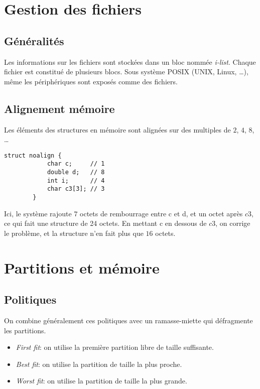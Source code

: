 \documentclass[a4paper]{article}
\begin{document}
\begin{multicols*}{2}
    \section{Gestion des fichiers}

    \subsection{Généralités}
    Les informations sur les fichiers sont stockées dans un bloc nommée \emph{i-list}.
    Chaque fichier est constitué de plusieurs blocs.
    Sous système {POSIX} ({UNIX}, Linux, \ldots), même les périphériques sont exposés comme des fichiers.

    \subsection{Alignement mémoire}

    Les éléments des structures en mémoire sont alignées sur des multiples de $2$, $4$, $8$, \ldots
    
    \begin{lstlisting}[frame=shadowbox]
        struct noalign {
            char c;     // 1
            double d;   // 8
            int i;      // 4
            char c3[3]; // 3
        }
    \end{lstlisting}

    Ici, le système rajoute $7$ octets de rembourrage entre c et d, et un octet après $c3$, ce qui fait une structure de 24 octets.
    En mettant c en dessous de $c3$, on corrige le problème, et la structure n'en fait plus que $16$ octets.

    \section{Partitions et mémoire}
    
    \subsection{Politiques}

    On combine généralement ces politiques avec un ramasse-miette qui défragmente les partitions.

    \begin{itemize}
        \item \emph{First fit}: on utilise la première partition libre de taille suffisante.
        \item \emph{Best fit}: on utilise la partition de taille la plus proche.
        \item \emph{Worst fit}: on utilise la partition de taille la plus grande.
    \end{itemize}


\end{multicols*}
\end{document}
